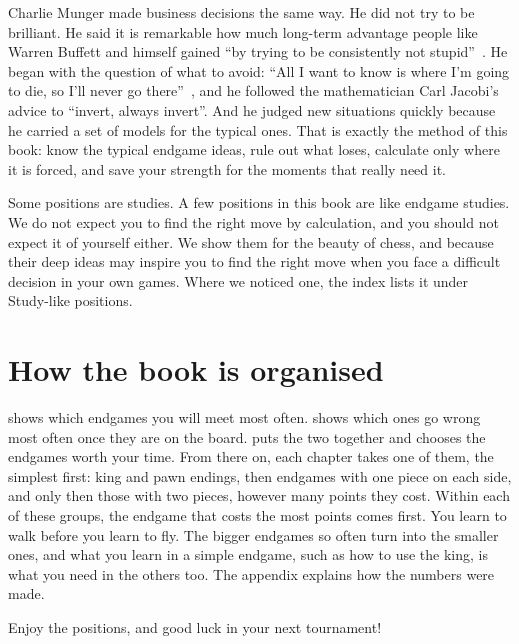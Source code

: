 Charlie Munger made business decisions the same way. He did not try to be brilliant. He said it is
remarkable how much long-term advantage people like Warren Buffett and himself gained ``by trying
to be consistently not stupid''~\cite{Munger:2005-almanack}. He began with the question of what to
avoid: ``All I want to know is where I'm going to die, so I'll never go
there''~\cite{Sorsaburu:avoid-ineptitude}, and he followed the mathematician Carl Jacobi's advice
to ``invert, always invert''. And he judged new situations quickly because he carried a set of
models for the typical ones. That is exactly the method of this book: know the typical endgame
ideas, rule out what loses, calculate only where it is forced, and save your strength for the
moments that really need it.

Some positions are studies. A few positions in this book are like endgame studies. We do
not expect you to find the right move by calculation, and you should not expect it of yourself
either. We show them for the beauty of chess, and because their deep ideas may inspire you to
find the right move when you face a difficult decision in your own games. Where we noticed one, the
index lists it under Study-like positions.

\section*{How the book is organised}
 shows which endgames you will meet most often. 
shows which ones go wrong most often once they are on the board. 
puts the two together and chooses the endgames worth your time. From there on, each chapter takes
one of them, the simplest first: king and pawn endings, then endgames with one piece on each side,
and only then those with two pieces, however many points they cost. Within each of these groups,
the endgame that costs the most points comes first. You learn to walk before you learn to fly.
The bigger endgames so often turn into the smaller ones, and what you learn in a
simple endgame, such as how to use the king, is what you need in the others too. The appendix
explains how the numbers were made.

Enjoy the positions, and good luck in your next tournament!

